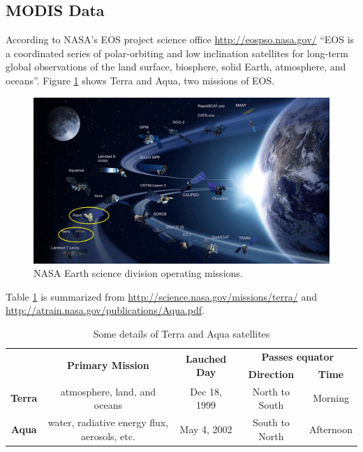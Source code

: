 \documentclass{article}\usepackage[]{graphicx}\usepackage[]{color}
\begin{document}
\subsection{MODIS Data}\label{SubSec:ModisData}

According to NASA's EOS project science office \url{http://eospso.nasa.gov/}  ``EOS is a coordinated series of polar-orbiting and low inclination satellites for long-term global observations of the land surface, biosphere, solid Earth, atmosphere, and oceans''. Figure \ref{Fig: NASA EOS} shows Terra and Aqua, two missions of EOS.  
\begin{figure}[!ht]
\begin{center}
\includegraphics[width=16cm]{nasaEOS.png}
\caption{NASA Earth science division operating missions.}
\label{Fig: NASA EOS}
\end{center}
\end{figure}


Table \ref{Tab:TnA} is summarized from \url{http://science.nasa.gov/missions/terra/} and \url{http://atrain.nasa.gov/publications/Aqua.pdf}.

\begin{table}[!ht]
\caption{Some details of Terra and Aqua satellites}\label{Tab:TnA}
\centering
\def\arraystretch{1.5}
\begin{tabular}{c|cccc}
& \multirow{2}{*}{\textbf{Primary Mission}} &\multirow{2}{*}{\textbf{Lauched Day}} 
& \multicolumn{2}{c}{\textbf{Passes equator}}\\
\cline{4-5}
& & & \textbf{Direction} & \textbf{Time}\\
\hline
\textbf{Terra} & atmosphere, land, and oceans & Dec 18, 1999  & North to South & Morning\\
\textbf{Aqua} & water, radiative energy flux, aerosols, etc. & May 4, 2002  & South to North & Afternoon
\end{tabular}
\end{table}
\end{document}
